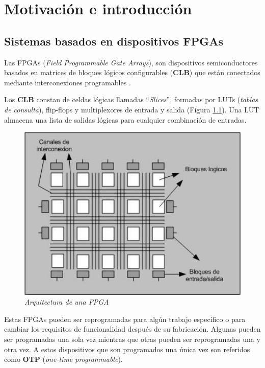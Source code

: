\chapter{Motivación e introducción}


\section{Sistemas basados en dispositivos FPGAs} 

Las FPGAs (\textit{Field Programmable Gate Arrays}), son dispositivos semiconductores basados en matrices de bloques lógicos configurables
(\textbf{CLB}) que están conectados mediante interconexiones programables \cite{fpga_xilinx}. 

Los \textbf{CLB} constan de celdas lógicas llamadas ``\textit{Slices}'', formadas por LUTs (\textit{tablas de consulta}), flip-flops y 
multiplexores de entrada y salida (Figura \ref{arqFPGA}). Una LUT almacena una lista de salidas lógicas para cualquier combinación de 
entradas. 

\begin{figure}[H]
    \centering
    \includegraphics[width = 1\textwidth]{imagenes/arqFPGA.png}
    \caption{\textit{Arquitectura de una FPGA}}\label{arqFPGA}
\end{figure}

Estas FPGAs pueden ser reprogramadas para  algún trabajo específico o para cambiar los requisitos de funcionalidad después de su 
fabricación. Algunas pueden ser programadas una sola vez mientras que otras pueden ser reprogramadas una y otra vez. A estos 
dispositivos que son programados una única vez son referidos como \textbf{OTP} (\textit{one-time programmable}).

